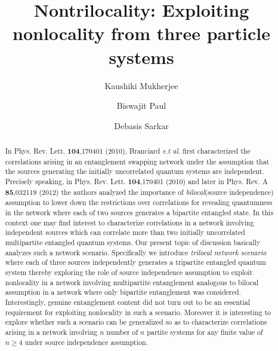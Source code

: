 \documentclass[pra,10pt,twocolumn,superscriptaddress,floatfix,showpacs]{revtex4-1}
\begin{document}
\title{Nontrilocality: Exploiting nonlocality from three particle systems}
\author{Kaushiki Mukherjee}

\author{Biswajit Paul}

\author{Debasis  Sarkar}


\begin{abstract}
In Phys. Rev. Lett. \textbf{104},170401 (2010), Branciard \textit{e.t al.} first characterized the correlations arising in an entanglement swapping network under the assumption that the sources generating the initially uncorrelated quantum systems are independent. Precisely speaking, in Phys. Rev. Lett. \textbf{104},170401 (2010) and later in Phys. Rev. A \textbf{85},032119 (2012) the authors analyzed the importance of \textit{bilocal}(source independence) assumption to lower down the restrictions over correlations for revealing quantumness in the network where each  of two sources generates a bipartite entangled state. In this context one may find interest to characterize correlations in a network involving independent sources which can correlate more than two initially uncorrelated multipartite entangled quantum systems. Our present topic of discussion basically analyzes such a network scenario. Specifically we introduce \textit{trilocal network scenario} where each of three sources  independently generates a tripartite entangled quantum system thereby exploring the role of source independence assumption to exploit nonlocality in a network involving multipartite entanglement analogous to bilocal assumption in a network where only bipartite entanglement was considered. Interestingly, genuine entanglement content did not turn out to be an essential requirement for exploiting nonlocality in such a scenario. Moreover it is interesting to explore whether such a scenario can be generalized so as to characterize correlations arising in a network involving $n$ number of $n$ partite systems for any finite value of $n\geq4$ under source independence assumption.
\end{abstract}
\end{document}

